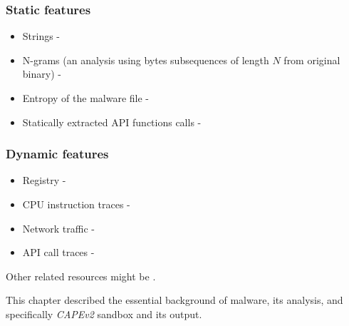\subsubsection{Static features}
\begin{itemize}
  \item Strings - \cite{Lee2011}
  \item N-grams (an analysis using bytes subsequences of length $N$ from original binary) - \cite{Fuyong2017}
  \item Entropy of the malware file - \cite{Wojnowicz2018}
  \item Statically extracted API functions calls - \cite{Ahmadi2016}
\end{itemize}

\subsubsection{Dynamic features}
\begin{itemize}
  \item Registry - \cite{Ghiasi2015}
  \item CPU instruction traces - \cite{Carlin2017}
  \item Network traffic - \cite{Boukhtouta2015}
  \item API call traces -  \cite{Galal2015}
\end{itemize}

Other related resources might be \cite{Singh2020, Sethi2019, Abdessadki2019, Gibert2020}.


This chapter described the essential background of malware, its analysis, and specifically \emph{CAPEv2} sandbox and its output. 





